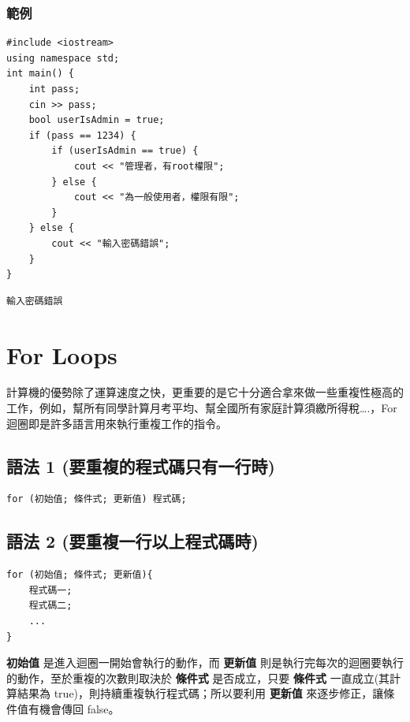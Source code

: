 \documentclass[12pt,a4paper]{article}
\begin{document}
\subsubsection{範例}
\label{sec:org3dbc6a9}
\lstset{breaklines=true,language=cpp,label= ,caption= ,captionpos=b,firstnumber=1,numbers=left}
\begin{lstlisting}
#include <iostream>
using namespace std;
int main() {
    int pass;
    cin >> pass;
    bool userIsAdmin = true;
    if (pass == 1234) {
        if (userIsAdmin == true) {
            cout << "管理者，有root權限";
        } else {
            cout << "為一般使用者，權限有限";
        }
    } else {
        cout << "輸入密碼錯誤";
    }
}
\end{lstlisting}

\begin{verbatim}
輸入密碼錯誤
\end{verbatim}

\section{For Loops}
\label{cpp_for_loop}
計算機的優勢除了運算速度之快，更重要的是它十分適合拿來做一些重複性極高的工作，例如，幫所有同學計算月考平均、幫全國所有家庭計算須繳所得稅\ldots{}.，For 迴圈即是許多語言用來執行重複工作的指令。
\subsection{語法 1 (要重複的程式碼只有一行時)}
\label{sec:orge834a32}
\lstset{breaklines=true,language=cpp,label= ,caption= ,captionpos=b,firstnumber=1,numbers=left}
\begin{lstlisting}
for (初始值; 條件式; 更新值) 程式碼;
\end{lstlisting}
\subsection{語法 2 (要重複一行以上程式碼時)}
\label{sec:org5be9f7e}
\lstset{breaklines=true,language=cpp,label= ,caption= ,captionpos=b,firstnumber=1,numbers=left}
\begin{lstlisting}
for (初始值; 條件式; 更新值){
    程式碼一;
    程式碼二;
    ...
}
\end{lstlisting}

\textbf{初始值} 是進入迴圈一開始會執行的動作，而 \textbf{更新值} 則是執行完每次的迴圈要執行的動作，至於重複的次數則取決於 \textbf{條件式} 是否成立，只要 \textbf{條件式} 一直成立(其計算結果為 true)，則持續重複執行程式碼；所以要利用 \textbf{更新值} 來逐步修正，讓條件值有機會傳回 false。
\end{document}

